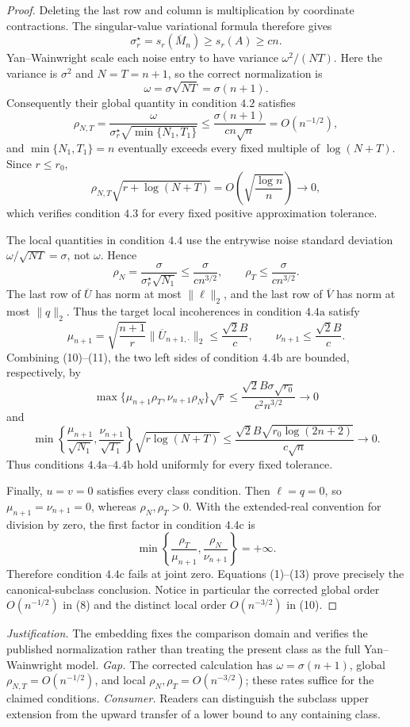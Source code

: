 \documentclass{article}
\begin{document}
\begin{proof}
Deleting the last row and column is multiplication by coordinate contractions.  The singular-value variational formula therefore gives
\[
\sigma_r^\star=s_r(\overline M_n)\ge s_r(A)\ge cn.
\tag{6}
\]
Yan--Wainwright scale each noise entry to have variance \(\omega^2/(NT)\).  Here the variance is \(\sigma^2\) and \(N=T=n+1\), so the correct normalization is
\[
\omega=\sigma\sqrt{NT}=\sigma(n+1).
\tag{7}
\]
Consequently their global quantity in condition \(4.2\) satisfies
\[
\rho_{N,T}
=\frac{\omega}{\sigma_r^\star\sqrt{\min\{N_1,T_1\}}}
\le\frac{\sigma(n+1)}{cn\sqrt n}=O(n^{-1/2}),
\tag{8}
\]
and \(\min\{N_1,T_1\}=n\) eventually exceeds every fixed multiple of \(\log(N+T)\).  Since \(r\le r_0\),
\[
\rho_{N,T}\sqrt{r+\log(N+T)}
=O\left(\sqrt{\frac{\log n}{n}}\right)\longrightarrow0,
\tag{9}
\]
which verifies condition \(4.3\) for every fixed positive approximation tolerance.

The local quantities in condition \(4.4\) use the entrywise noise standard deviation \(\omega/\sqrt{NT}=\sigma\), not \(\omega\).  Hence
\[
\rho_N=\frac{\sigma}{\sigma_r^\star\sqrt{N_1}}
\le\frac{\sigma}{cn^{3/2}},
\qquad
\rho_T\le\frac{\sigma}{cn^{3/2}}.
\tag{10}
\]
The last row of \(\overline U\) has norm at most \(\|\ell\|_2\), and the last row of \(\overline V\) has norm at most \(\|q\|_2\).  Thus the target local incoherences in condition \(4.4\mathrm a\) satisfy
\[
\mu_{n+1}=\sqrt{\frac{n+1}{r}}
\|\overline U_{n+1,\boldsymbol\cdot}\|_2
\le\frac{\sqrt2B}{c},
\qquad
\nu_{n+1}\le\frac{\sqrt2B}{c}.
\tag{11}
\]
Combining (10)--(11), the two left sides of condition \(4.4\mathrm b\) are bounded, respectively, by
\[
\max\{\mu_{n+1}\rho_T,\nu_{n+1}\rho_N\}\sqrt r
\le\frac{\sqrt2B\sigma\sqrt{r_0}}{c^2n^{3/2}}\longrightarrow0
\tag{12}
\]
and
\[
\min\left\{\frac{\mu_{n+1}}{\sqrt{N_1}},
\frac{\nu_{n+1}}{\sqrt{T_1}}\right\}
\sqrt{r\log(N+T)}
\le\frac{\sqrt2B\sqrt{r_0\log(2n+2)}}{c\sqrt n}\longrightarrow0.
\tag{13}
\]
Thus conditions \(4.4\mathrm a\)--\(4.4\mathrm b\) hold uniformly for every fixed tolerance.

Finally, \(u=v=0\) satisfies every class condition.  Then \(\ell=q=0\), so \(\mu_{n+1}=\nu_{n+1}=0\), whereas \(\rho_N,\rho_T>0\).  With the extended-real convention for division by zero, the first factor in condition \(4.4\mathrm c\) is
\[
\min\left\{\frac{\rho_T}{\mu_{n+1}},
\frac{\rho_N}{\nu_{n+1}}\right\}=+\infty.
\]
Therefore condition \(4.4\mathrm c\) fails at joint zero.  Equations (1)--(13) prove precisely the canonical-subclass conclusion.  Notice in particular the corrected global order \(O(n^{-1/2})\) in (8) and the distinct local order \(O(n^{-3/2})\) in (10).
\end{proof}
\par\smallskip\noindent \textit{Justification.} The embedding fixes the comparison domain and verifies the published normalization rather than treating the present class as the full Yan--Wainwright model. \textit{Gap.} The corrected calculation has \(\omega=\sigma(n+1)\), global \(\rho_{N,T}=O(n^{-1/2})\), and local \(\rho_N,\rho_T=O(n^{-3/2})\); these rates suffice for the claimed conditions. \textit{Consumer.} Readers can distinguish the subclass upper extension from the upward transfer of a lower bound to any containing class.
\end{document}
